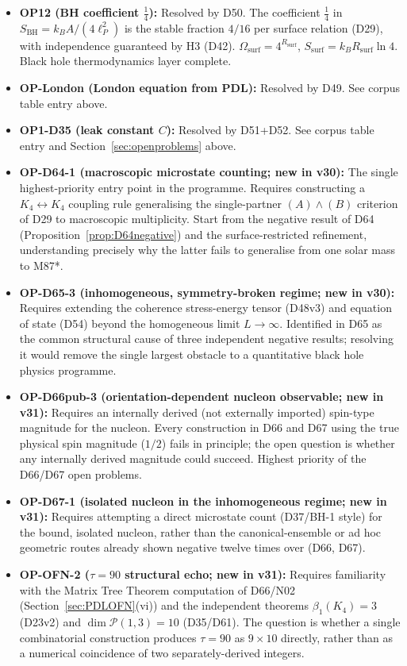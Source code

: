 \documentclass[11pt,a4paper]{article}
\theoremstyle{plain}
\theoremstyle{definition}
\theoremstyle{remark}
\newcommand{\Rsurf}{R_{\mathrm{surf}}}
\newcommand{\SBH}{S_{\mathrm{BH}}}
\begin{document}
\begin{itemize}
\item \textbf{OP12 (BH coefficient $\tfrac{1}{4}$):} \textcolor{proofblue}{Resolved by D50.} The coefficient $\tfrac{1}{4}$ in $\SBH = k_B A/(4\ell_P^2)$ is the stable fraction $4/16$ per surface relation (D29), with independence guaranteed by H3 (D42). $\Omega_{\mathrm{surf}} = 4^{\Rsurf}$, $S_{\mathrm{surf}} = k_B\Rsurf\ln 4$. Black hole thermodynamics layer complete.
\item \textbf{OP-London (London equation from PDL):} \textcolor{proofblue}{Resolved by D49.} See corpus table entry above.
\item \textbf{OP1-D35 (leak constant $C$):} \textcolor{proofblue}{Resolved by D51+D52.} See corpus table entry and Section~\ref{sec:openproblems} above.
\item \textbf{OP-D64-1 (macroscopic microstate counting; new in v30):} The single highest-priority entry point in the programme. Requires constructing a $K_4\leftrightarrow K_4$ coupling rule generalising the single-partner $(A)\wedge(B)$ criterion of D29 to macroscopic multiplicity. Start from the negative result of D64 (Proposition~\ref{prop:D64negative}) and the surface-restricted refinement, understanding precisely why the latter fails to generalise from one solar mass to M87*.
\item \textbf{OP-D65-3 (inhomogeneous, symmetry-broken regime; new in v30):} Requires extending the coherence stress-energy tensor (D48v3) and equation of state (D54) beyond the homogeneous limit $L\to\infty$. Identified in D65 as the common structural cause of three independent negative results; resolving it would remove the single largest obstacle to a quantitative black hole physics programme.
\item \textbf{OP-D66pub-3 (orientation-dependent nucleon observable; new in v31):} Requires an internally derived (not externally imported) spin-type magnitude for the nucleon. Every construction in D66 and D67 using the true physical spin magnitude ($1/2$) fails in principle; the open question is whether any internally derived magnitude could succeed. Highest priority of the D66/D67 open problems.
\item \textbf{OP-D67-1 (isolated nucleon in the inhomogeneous regime; new in v31):} Requires attempting a direct microstate count (D37/BH-1 style) for the bound, isolated nucleon, rather than the canonical-ensemble or ad hoc geometric routes already shown negative twelve times over (D66, D67).
\item \textbf{OP-OFN-2 ($\tau=90$ structural echo; new in v31):} Requires familiarity with the Matrix Tree Theorem computation of D66/N02 (Section~\ref{sec:PDLOFN}(vi)) and the independent theorems $\beta_1(K_4)=3$ (D23v2) and $\dim\mathcal P(1,3)=10$ (D35/D61). The question is whether a single combinatorial construction produces $\tau=90$ as $9\times10$ directly, rather than as a numerical coincidence of two separately-derived integers.
\end{itemize}
\end{document}

